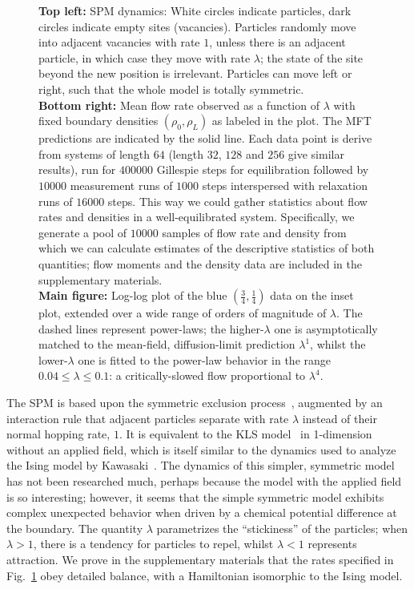 \documentclass[
reprint,
 amsmath,amssymb,
 aps,
 prl
]{revtex4-1}
\begin{document}
\begin{figure}[h!]
    \vspace{-1em}
\vspace{1em}
\caption{\label{fig:lambdaScans} \textbf{Top left:}  SPM
  dynamics: White circles indicate particles, dark circles indicate
  empty sites (vacancies). Particles randomly move into adjacent
  vacancies with rate $1$,
unless there is an adjacent particle, in which case they move with
rate $\lambda$; the state of the site beyond the new position is
irrelevant.  Particles can move left or right, such that the whole
model is totally symmetric.\\ \textbf{Bottom right:} Mean flow rate
observed as a function of $\lambda$ with fixed boundary densities
$(\rho_0, \rho_L)$ as labeled in the plot.  The MFT predictions are
indicated by the solid line.  Each data point is derive from systems of length
$64$ (length $32$, $128$ and $256$ give similar results), run
for $400000$ Gillespie steps for equilibration followed by $10000$
measurement runs of $1000$ steps interspersed with relaxation runs of
$16000$ steps. This way we could gather statistics about flow rates
and densities in a well-equilibrated system. Specifically, we generate
a pool of $10000$ samples of flow rate and density from which we can
calculate estimates of the descriptive statistics of both quantities;
flow moments and the density data are included in the supplementary
materials.\\ \textbf{Main figure:} Log-log plot of the blue $\left( \frac{3}{4} ,
\frac{1}{4} \right)$ data on the inset plot, extended over
a wide range of orders of magnitude of $\lambda$.  The dashed lines
represent power-laws; the higher-$\lambda$ one is asymptotically
matched to the mean-field, diffusion-limit prediction $\lambda^1$,
whilst the lower-$\lambda$ one is fitted to the power-law behavior in
the range $0.04 \le \lambda \le 0.1$: a critically-slowed flow
proportional to $\lambda^4$.
\vspace{1em}}
\end{figure}

The SPM is based upon the symmetric exclusion
process~\cite{sugden2007dynamically, Kollmann2003, Lin2005, Hegde2014,
  Krapivsky2014, Imamura2017}, augmented by an interaction rule that
adjacent particles separate with rate $\lambda$ instead of their
normal hopping rate, $1$. It is equivalent to the KLS
model~\cite{Katz1984, Zia2010, Kafri2003} in 1-dimension without an
applied field, which is itself similar to the dynamics used to analyze
the Ising model by Kawasaki~\cite{PhysRev.145.224}.  The dynamics of
this simpler, symmetric model has not been researched much, perhaps because
the model with the applied field is so interesting; however, it seems
that the simple symmetric model exhibits complex unexpected behavior
when driven by a chemical potential difference at the boundary. The quantity $\lambda$
parametrizes the ``stickiness'' of the particles; when $\lambda>1$,
there is a tendency for particles to repel, whilst $\lambda < 1$
represents attraction.  We prove in the supplementary materials that
the rates specified in Fig.~\ref{fig:lambdaScans} obey detailed
balance, with a Hamiltonian isomorphic to the Ising model.
\end{document}
